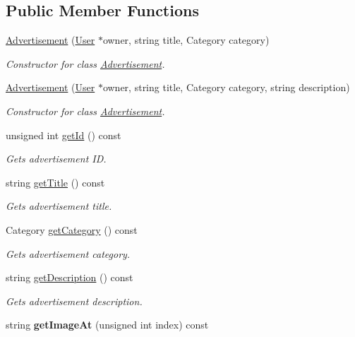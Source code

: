 \subsection*{Public Member Functions}
\begin{DoxyCompactItemize}
\item 
\hyperlink{class_advertisement_a3819a25a48afbca0a6da6717ef0d6da3}{Advertisement} (\hyperlink{class_user}{User} $\ast$owner, string title, Category category)
\begin{DoxyCompactList}\small\item\em Constructor for class \hyperlink{class_advertisement}{Advertisement}. \end{DoxyCompactList}\item 
\hyperlink{class_advertisement_a343d31bb9f21892718fc4a756f7eb05c}{Advertisement} (\hyperlink{class_user}{User} $\ast$owner, string title, Category category, string description)
\begin{DoxyCompactList}\small\item\em Constructor for class \hyperlink{class_advertisement}{Advertisement}. \end{DoxyCompactList}\item 
unsigned int \hyperlink{class_advertisement_aa66d9158d12ae99a04f81cf2adb155fd}{get\+Id} () const 
\begin{DoxyCompactList}\small\item\em Gets advertisement I\+D. \end{DoxyCompactList}\item 
string \hyperlink{class_advertisement_ac65aa68caf2b1697c0cc04f2ebb0fd99}{get\+Title} () const 
\begin{DoxyCompactList}\small\item\em Gets advertisement title. \end{DoxyCompactList}\item 
Category \hyperlink{class_advertisement_a123c05d427fed1ac7fec0f55050da20d}{get\+Category} () const 
\begin{DoxyCompactList}\small\item\em Gets advertisement category. \end{DoxyCompactList}\item 
string \hyperlink{class_advertisement_ac455b4918dbd923af81efbaebf924985}{get\+Description} () const 
\begin{DoxyCompactList}\small\item\em Gets advertisement description. \end{DoxyCompactList}\item 
\hypertarget{class_advertisement_a260fbb1a64495a5e99591202389744a0}{}string {\bfseries get\+Image\+At} (unsigned int index) const \label{class_advertisement_a260fbb1a64495a5e99591202389744a0}


\end{DoxyCompactItemize}
